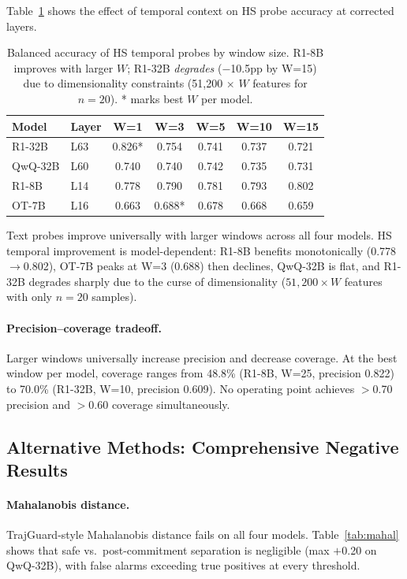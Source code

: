 \documentclass[11pt]{article}
\begin{document}
Table~\ref{tab:temporal} shows the effect of temporal context on HS probe accuracy at corrected layers.

\begin{table}[t]
\centering
\small
\begin{tabular}{llccccc}
\toprule
\textbf{Model} & \textbf{Layer} & \textbf{W=1} & \textbf{W=3} & \textbf{W=5} & \textbf{W=10} & \textbf{W=15} \\
\midrule
R1-32B & L63 & 0.826* & 0.754 & 0.741 & 0.737 & 0.721 \\
QwQ-32B & L60 & 0.740 & 0.740 & 0.742 & 0.735 & 0.731 \\
R1-8B & L14 & 0.778 & 0.790 & 0.781 & 0.793 & 0.802 \\
OT-7B & L16 & 0.663 & 0.688* & 0.678 & 0.668 & 0.659 \\
\bottomrule
\end{tabular}
\caption{Balanced accuracy of HS temporal probes by window size. R1-8B improves with larger $W$; R1-32B \emph{degrades} ($-$10.5pp by W=15) due to dimensionality constraints (51,200 $\times$ $W$ features for $n{=}20$). * marks best $W$ per model.}
\label{tab:temporal}
\end{table}

Text probes improve universally with larger windows across all four models. HS temporal improvement is model-dependent: R1-8B benefits monotonically (0.778$\to$0.802), OT-7B peaks at W=3 (0.688) then declines, QwQ-32B is flat, and R1-32B degrades sharply due to the curse of dimensionality ($51{,}200 \times W$ features with only $n{=}20$ samples).

\paragraph{Precision--coverage tradeoff.}
Larger windows universally increase precision and decrease coverage. At the best window per model, coverage ranges from 48.8\% (R1-8B, W=25, precision 0.822) to 70.0\% (R1-32B, W=10, precision 0.609). No operating point achieves $>$0.70 precision and $>$0.60 coverage simultaneously.

\subsection{Alternative Methods: Comprehensive Negative Results}

\paragraph{Mahalanobis distance.}
TrajGuard-style Mahalanobis distance fails on all four models. Table~\ref{tab:mahal} shows that safe vs.\ post-commitment separation is negligible (max $+$0.20 on QwQ-32B), with false alarms exceeding true positives at every threshold.
\end{document}
